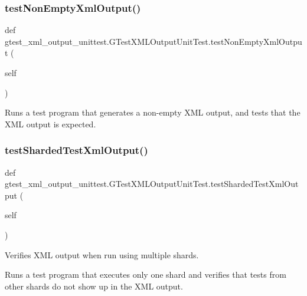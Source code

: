 \subsubsection{\texorpdfstring{testNonEmptyXmlOutput()}{testNonEmptyXmlOutput()}}
{\footnotesize\ttfamily def gtest\+\_\+xml\+\_\+output\+\_\+unittest.\+G\+Test\+X\+M\+L\+Output\+Unit\+Test.\+test\+Non\+Empty\+Xml\+Output (\begin{DoxyParamCaption}\item[{}]{self }\end{DoxyParamCaption})}

\begin{DoxyVerb}Runs a test program that generates a non-empty XML output, and
tests that the XML output is expected.
\end{DoxyVerb}
 \mbox{\label{classgtest__xml__output__unittest_1_1GTestXMLOutputUnitTest_adc6a611bd7c433ecd84876dcb2ac1df1}} 
\subsubsection{\texorpdfstring{testShardedTestXmlOutput()}{testShardedTestXmlOutput()}}
{\footnotesize\ttfamily def gtest\+\_\+xml\+\_\+output\+\_\+unittest.\+G\+Test\+X\+M\+L\+Output\+Unit\+Test.\+test\+Sharded\+Test\+Xml\+Output (\begin{DoxyParamCaption}\item[{}]{self }\end{DoxyParamCaption})}

\begin{DoxyVerb}Verifies XML output when run using multiple shards.

Runs a test program that executes only one shard and verifies that tests
from other shards do not show up in the XML output.
\end{DoxyVerb}
 \mbox{\label{classgtest__xml__output__unittest_1_1GTestXMLOutputUnitTest_ac6df46d6831892e4c14dbdfae0049618}} 

